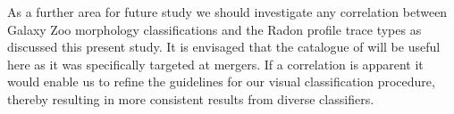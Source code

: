 As a further area for future study we should investigate any correlation between Galaxy Zoo morphology classifications and the Radon profile trace types as discussed this present study. It is envisaged that the catalogue of \citet{2018MNRAS.479..415A} will be useful here as it was specifically targeted at mergers. If a correlation is apparent it would enable us to refine the guidelines for our visual classification procedure, thereby resulting in more consistent results from diverse classifiers.